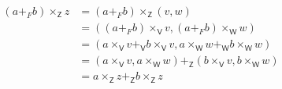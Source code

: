 \documentclass[letterpaper,12pt]{article}
\newcommand{\?}{\stackrel{?}{=}}
\begin{document}
\begin{spacing}{1.5}
\begin{enumerate}
\begin{enumerate}[(VS 1)]
\begin{align}
\left(a +_F b\right)\times_\mathsf{Z} z &= \left(a +_F
  b\right)\times_\mathsf{Z} \left(v,w\right)\\
&=
\left(\left(a+_Fb\right)\times_\mathsf{V}v,\left(a+_Fb\right)\times_\mathsf{W}w\right)\\
&=\left(a\times_\mathsf{V}v +_\mathsf{V}
  b\times_\mathsf{V}v,a\times_\mathsf{W}w +_\mathsf{W}
  b\times_\mathsf{W}w\right)\\
&= \left(a\times_\mathsf{V}v,a\times_\mathsf{W}w\right) +_\mathsf{Z}
\left(b\times_\mathsf{V}v,b\times_\mathsf{W}w\right)\\
&= a\times_\mathsf{Z}z +_\mathsf{Z} b\times_\mathsf{Z}z
\end{align}








\end{enumerate}
\end{enumerate}
\newpage{}

\end{spacing}
\end{document}
